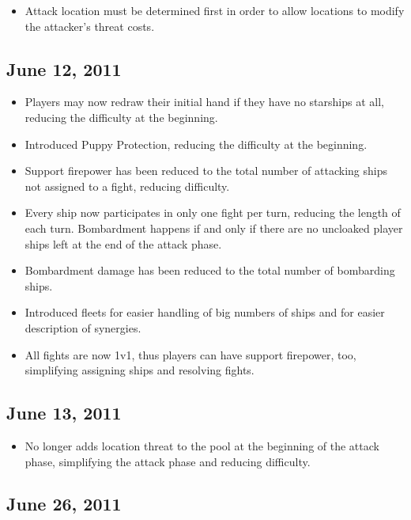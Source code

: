 \documentclass[11pt, a4paper]{article}
\begin{document}
\begin{itemize}
 \item Attack location must be determined first in order to allow locations to
modify the attacker's threat costs.
\end{itemize}

\subsection{June 12, 2011}

\begin{itemize}
 \item Players may now redraw their initial hand if they have no starships at
all, reducing the difficulty at the beginning.
 \item Introduced Puppy Protection, reducing the difficulty at the beginning.
 \item Support firepower has been reduced to the total number of attacking ships
not assigned to a fight, reducing difficulty.
 \item Every ship now participates in only one fight per turn, reducing the
length of each turn. Bombardment happens if and only if there are no uncloaked
player ships left at the end of the attack phase.
 \item Bombardment damage has been reduced to the total number of bombarding
ships.
 \item Introduced fleets for easier handling of big numbers of ships and for
easier description of synergies.
 \item All fights are now 1v1, thus players can have support firepower, too,
simplifying assigning ships and resolving fights.
\end{itemize}

\subsection{June 13, 2011}

\begin{itemize}
 \item No longer adds location threat to the pool at the beginning of the attack
phase, simplifying the attack phase and reducing difficulty.
\end{itemize}

\subsection{June 26, 2011}
\end{document}
